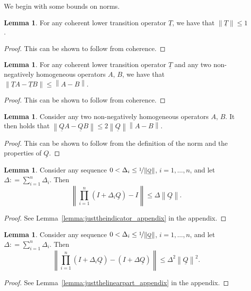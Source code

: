 \documentclass[10pt]{paper}
\theoremstyle{definition}
\newtheorem{lemma}[theorem]{Lemma}
\newcommand{\lt}{\underline{T}}
\newcommand{\lrate}{\underline{Q}}
\newcommand{\norm}[1]{\left\lVert #1 \right\rVert}
\newcommand{\coloneqq}{:\!=}
\begin{document}
We begin with some bounds on norms.

\begin{lemma}\label{lemma:normofcoherenttrans}
For any coherent lower transition operator $\lt$, we have that $\norm{\lt}\leq 1$.
\end{lemma}
\begin{proof}
This can be shown to follow from coherence.
\end{proof}

\begin{lemma}\label{lemma:differencenormofcoherenttrans}
For any coherent lower transition operator $\lt$ and any two non-negatively homogeneous operators $A$, $B$, we have that $\norm{\lt A-\lt B}\leq \norm{A-B}$.
\end{lemma}
\begin{proof}
This can be shown to follow from coherence.
\end{proof}

\begin{lemma}\label{lemma:differencenormofcoherenttransrate}
Consider any two non-negatively homogeneous operators $A$, $B$. It then holds that $\norm{\lrate A-\lrate B}\leq 2\norm{\lrate}\norm{A-B}$.
\end{lemma}
\begin{proof}
This can be shown to follow from the definition of the norm and the properties of $\lrate$.
\end{proof}


\begin{lemma}\label{lemma:justtheindicator}
Consider any sequence $0<\Delta_i\leq\nicefrac{1}{\norm{\lrate}}$, $i=1,\dots,n$, and let $\Delta\coloneqq\sum_{i=1}^n\Delta_i$. Then
\begin{equation*}
\norm{\prod_{i=1}^n(I+\Delta_i\lrate)-I}\leq\Delta\norm{\lrate}.
\end{equation*}
\end{lemma}
\begin{proof}
See Lemma~\ref{lemma:justtheindicator_appendix} in the appendix.
\end{proof}

\begin{lemma}\label{lemma:justthelinearpart}
Consider any sequence $0<\Delta_i\leq\nicefrac{1}{\norm{\lrate}}$, $i=1,\dots,n$, and let $\Delta\coloneqq\sum_{i=1}^n\Delta_i$. Then
\begin{equation*}
\norm{\prod_{i=1}^n(I+\Delta_i\lrate)-(I+\Delta\lrate)}\leq\Delta^2\norm{\lrate}^2.
\end{equation*}
\end{lemma}
\begin{proof}
See Lemma~\ref{lemma:justthelinearpart_appendix} in the appendix.
\end{proof}
\end{document}
